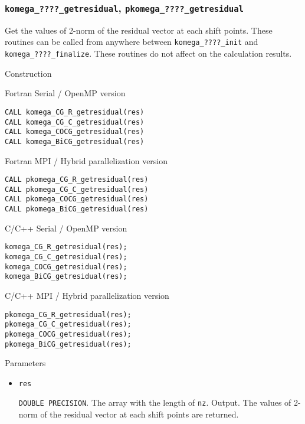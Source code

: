 \documentclass[12pt,titlepage]{article}
\begin{document}
\subsubsection{\texttt{komega\_????\_getresidual}, \texttt{pkomega\_????\_getresidual}}

Get the values of 2-norm of the residual vector at each shift points.
These routines can be called from anywhere between  \verb|komega_????_init| and \verb|komega_????_finalize|.
These routines do not affect on the calculation results.

\noindent Construction

\noindent Fortran Serial / OpenMP version
\begin{verbatim}
CALL komega_CG_R_getresidual(res)
CALL komega_CG_C_getresidual(res)
CALL komega_COCG_getresidual(res)
CALL komega_BiCG_getresidual(res)
\end{verbatim}

\noindent Fortran MPI / Hybrid parallelization version
\begin{verbatim}
CALL pkomega_CG_R_getresidual(res)
CALL pkomega_CG_C_getresidual(res)
CALL pkomega_COCG_getresidual(res)
CALL pkomega_BiCG_getresidual(res)
\end{verbatim}

\noindent C/C++ Serial / OpenMP version
\begin{verbatim}
komega_CG_R_getresidual(res);
komega_CG_C_getresidual(res);
komega_COCG_getresidual(res);
komega_BiCG_getresidual(res);
\end{verbatim}

\noindent C/C++ MPI / Hybrid parallelization version
\begin{verbatim}
pkomega_CG_R_getresidual(res);
pkomega_CG_C_getresidual(res);
pkomega_COCG_getresidual(res);
pkomega_BiCG_getresidual(res);
\end{verbatim}

\noindent Parameters

\begin{itemize}
  
\item \verb|res|

  \verb|DOUBLE PRECISION|.
  The array with the length of \verb|nz|. Output.
  The values of 2-norm of the residual vector at each shift points are returned.

\end{itemize}
\end{document}
